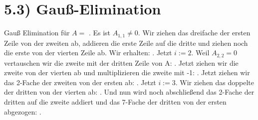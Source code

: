 \documentclass[titlepage]{article}
\begin{document}
	\section*{5.3) Gauß-Elimination}
	Gauß Elimination für $A=$
		\scalebox{0.7}{$\left(\begin{matrix}
			1&2&3&4\\
			3&6&10&11\\
			-1&-3&-1&1\\
			1&1&7&7&\\
		\end{matrix}\right)$}.
	Es ist $A_{1,1}\neq0.$ Wir ziehen das dreifache der ersten Zeile von der zweiten ab, addieren die erste Zeile auf die dritte und ziehen noch die erste von der vierten Zeile ab. Wir erhalten:
	\scalebox{0.7}{$\left(\begin{matrix}
		1&2&3&4\\
		0&0&1&-1\\
		0&-1&2&5\\
		0&-1&4&3&\\
	\end{matrix}\right)$}.
	Jetzt $i:=2$. Weil $A_{2,2}=0$ vertauschen wir die zweite mit der dritten Zeile von A:
	\scalebox{0.7}{$\left(\begin{matrix}
		1&2&3&4\\
		0&-1&2&5\\
		0&0&1&-1\\
		0&-1&4&3&\\
	\end{matrix}\right)$}.
	Jetzt ziehen wir die zweite von der vierten ab und multiplizieren die zweite mit -1:
	\scalebox{0.7}{$\left(\begin{matrix}
		1&2&3&4\\
		0&1&-2&-5\\
		0&0&1&-1\\
		0&0&2&-2&\\
	\end{matrix}\right)$}.
	Jetzt ziehen wir das 2-Fache der zweiten von der ersten ab:
	\scalebox{0.7}{$\left(\begin{matrix}
			1&0&7&14\\
			0&1&-2&-5\\
			0&0&1&-1\\
			0&0&2&-2&\\
		\end{matrix}\right)$}.
	Jetzt $i:=3$. Wir ziehen das doppelte der dritten von der vierten ab:
	\scalebox{0.7}{$\left(\begin{matrix}
			1&0&7&14\\
			0&1&-2&-5\\
			0&0&1&-1\\
			0&0&0&0&\\
		\end{matrix}\right)$}.
	Und nun wird noch abschließend das 2-Fache der dritten auf die zweite addiert und das 7-Fache der dritten von der ersten abgezogen:
	\scalebox{0.7}{$\left(\begin{matrix}
			1&0&0&21\\
			0&1&0&-7\\
			0&0&1&-1\\
			0&0&0&0&\\
		\end{matrix}\right)$}.
\end{document}

